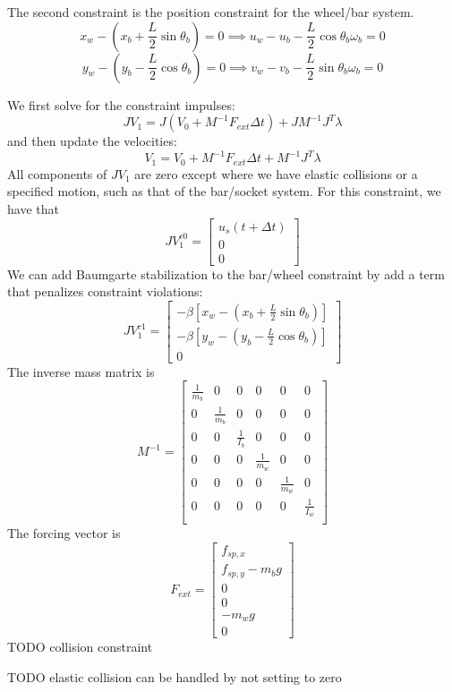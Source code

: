 \documentclass[9pt]{article}
\begin{document}
The second constraint is the position constraint for the wheel/bar system. 
\[
x_w - \left(x_b + \frac{L}{2}\sin \theta_b\right) = 0 \implies u_w - u_b - \frac{L}{2}\cos \theta_b \omega_b = 0
\]
\[
y_w - \left(y_b - \frac{L}{2}\cos \theta_b\right) = 0 \implies v_w - v_b - \frac{L}{2}\sin \theta_b \omega_b = 0
\]

We first solve for the constraint impulses:
\[
J V_1 = J (V_0 + M^{-1} F_{ext} \Delta t) + J M^{-1} J^T \lambda
\]
and then update the velocities:
\[
V_1 = V_0 + M^{-1} F_{ext} \Delta t + M^{-1} J^T \lambda
\]
All components of $JV_1$ are zero except where we have elastic collisions or a specified motion, such as that of the bar/socket system. For this constraint, we have that 
\[
JV_1^{c0} = 
\left[
\begin{array}{c}
u_s(t + \Delta t) \\
0 \\
0
\end{array} 
\right]
\]
We can add Baumgarte stabilization to the bar/wheel constraint by add a term that penalizes constraint violations:
\[
JV_1^{c1} = 
\left[
\begin{array}{c}
-\beta \left[x_w - \left(x_b + \frac{L}{2}\sin \theta_b\right)\right] \\
-\beta \left[y_w - \left(y_b - \frac{L}{2}\cos \theta_b\right)\right] \\
0
\end{array} 
\right]
\]
The inverse mass matrix is 
\[
M^{-1} = 
\left[
\begin{array}{cccccc}
\frac{1}{m_b} & 0 & 0 & 0 & 0 & 0 \\
0 & \frac{1}{m_b} & 0 & 0 & 0 & 0 \\
0 & 0 & \frac{1}{I_b} & 0 & 0 & 0 \\
0 & 0 & 0 & \frac{1}{m_w} & 0 & 0 \\
0 & 0 & 0 & 0 & \frac{1}{m_w} & 0 \\
0 & 0 & 0 & 0 & 0 & \frac{1}{I_w} \\
\end{array} 
\right]
\]
The forcing vector is 
\[
F_{ext} = 
\left[
\begin{array}{c}
f_{sp,x} \\
f_{sp,y} - m_b g \\
0 \\
0 \\
-m_w g \\
0
\end{array} 
\right]
\]
TODO collision constraint

TODO elastic collision can be handled by not setting to zero
\end{document}
